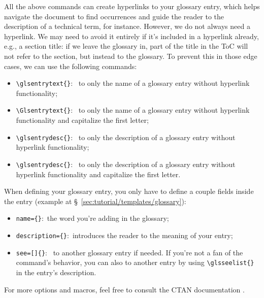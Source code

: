 All the above \glspl{command} can create \glspl{hyperlink} to your glossary entry, which helps navigate the document to find occurrences and guide the reader to the description of a technical term, for instance. However, we do not always need a \gls{hyperlink}. We may need to avoid it entirely if it's included in a \gls{hyperlink} already, e.g., a section title: if we leave the glossary  in, part of the title in the \gls{ToC} will not refer to the section, but instead to the glossary. To prevent this in those edge cases, we can use the following \glspl{command}:
\begin{itemize}
    \item \texttt{\textbackslash{}glsentrytext\{\}}:~ to only the name of a glossary entry without \gls{hyperlink} functionality;
    \item \texttt{\textbackslash{}Glsentrytext\{\}}:~ to only the name of a glossary entry without \gls{hyperlink} functionality and capitalize the first letter;
    \item \texttt{\textbackslash{}glsentrydesc\{\}}:~ to only the description of a glossary entry without \gls{hyperlink} functionality;
    \item \texttt{\textbackslash{}glsentrydesc\{\}}:~ to only the description of a glossary entry without \gls{hyperlink} functionality and capitalize the first letter.
\end{itemize}

When defining your glossary entry, you only have to define a couple fields inside the entry (example at \S~\ref{sec:tutorial/templates/glossary}):
\begin{itemize}
    \item \texttt{name=\{\}}:~the word you're adding in the glossary;
    \item \texttt{description=\{\}}:~introduces the reader to the meaning of your entry;
    \item \texttt{see=[]\{\}}:~ to another glossary entry if needed. If you're not a fan of the \gls{command}'s behavior, you can also  to another entry by using \texttt{\textbackslash{}glsseelist\{\}} in the entry's description.
\end{itemize}

\noindent For more options and \glspl{macro}, feel free to consult the \gls{CTAN} documentation \parencite{web:ctan-glossaries}.
